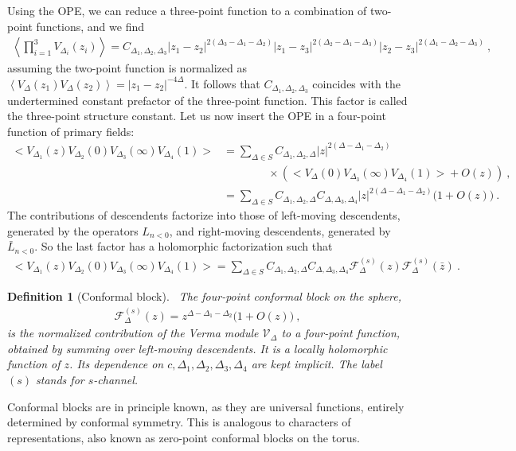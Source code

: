 \documentclass[12pt, a4paper]{article}
\theoremstyle{break}
\newtheorem{defn}[exo]{Definition}
\begin{document}
Using the OPE, we can reduce a three-point function to a combination of two-point functions, and we find 
\begin{align}
 \left<\prod_{i=1}^3 V_{\Delta_i}(z_i) \right> = C_{\Delta_1,\Delta_2,\Delta_3} |z_1-z_2|^{2(\Delta_3-\Delta_1-\Delta_2)} |z_1-z_3|^{2(\Delta_2-\Delta_1-\Delta_3)} |z_2-z_3|^{2(\Delta_1-\Delta_2-\Delta_3)}\ ,
\end{align}
assuming the two-point function is normalized as $\left< V_{\Delta}(z_1)V_{\Delta}(z_2) \right> = |z_1-z_2|^{-4\Delta}$.
It follows that $C_{\Delta_1,\Delta_2,\Delta_3}$ coincides with the undertermined constant prefactor of the three-point function. This factor is called the three-point structure constant.
Let us now insert the OPE in a four-point function of primary fields:
\begin{align}
 \Big<V_{\Delta_1}(z)V_{\Delta_2}(0)V_{\Delta_3}(\infty)V_{\Delta_4}(1)\Big>
 &= \sum_{\Delta\in S} C_{\Delta_1,\Delta_2,\Delta} |z|^{2(\Delta-\Delta_1-\Delta_2)}
 \nonumber
\\ & \qquad \qquad \times 
 \left(\Big< V_\Delta(0)V_{\Delta_3}(\infty)V_{\Delta_4}(1)\Big> + O(z)\right) \ ,
 \\
 &=  \sum_{\Delta\in S} C_{\Delta_1,\Delta_2,\Delta} C_{\Delta,\Delta_3,\Delta_4}
|z|^{2(\Delta-\Delta_1-\Delta_2)} \Big(1 +O(z) \Big)\ .
\end{align}
The contributions of descendents factorize into those of left-moving descendents, generated by the operators $L_{n<0}$, and right-moving descendents, generated by $\bar L_{n<0}$. So the last factor has a holomorphic factorization such that 
\begin{align}
\Big<V_{\Delta_1}(z)V_{\Delta_2}(0)V_{\Delta_3}(\infty)V_{\Delta_4}(1)\Big>
 =\sum_{\Delta\in S} C_{\Delta_1,\Delta_2,\Delta} C_{\Delta,\Delta_3,\Delta_4}  \mathcal{F}^{(s)}_\Delta(z) \mathcal{F}^{(s)}_\Delta(\bar z)\ .
 \label{sdec}
\end{align}

\begin{defn}[Conformal block]
 ~\label{def:block}
 The four-point conformal block on the sphere,
 \begin{align}
  \mathcal{F}^{(s)}_\Delta(z) = z^{\Delta-\Delta_1-\Delta_2}\Big( 1 + O(z) \Big)\ ,
  \label{eq:gsd}
 \end{align}
is the normalized contribution of the Verma module $\mathcal V_\Delta$ to a four-point function, obtained by summing over left-moving descendents. It is a locally holomorphic function of $z$. Its dependence on $c,\Delta_1,\Delta_2,\Delta_3,\Delta_4$ are kept implicit. The label $(s)$ stands for $s$-channel.
\end{defn}
Conformal blocks are in principle known, as they are universal functions, entirely determined by conformal symmetry. 
This is analogous to characters of representations, also known as zero-point conformal blocks on the torus.
\end{document}

